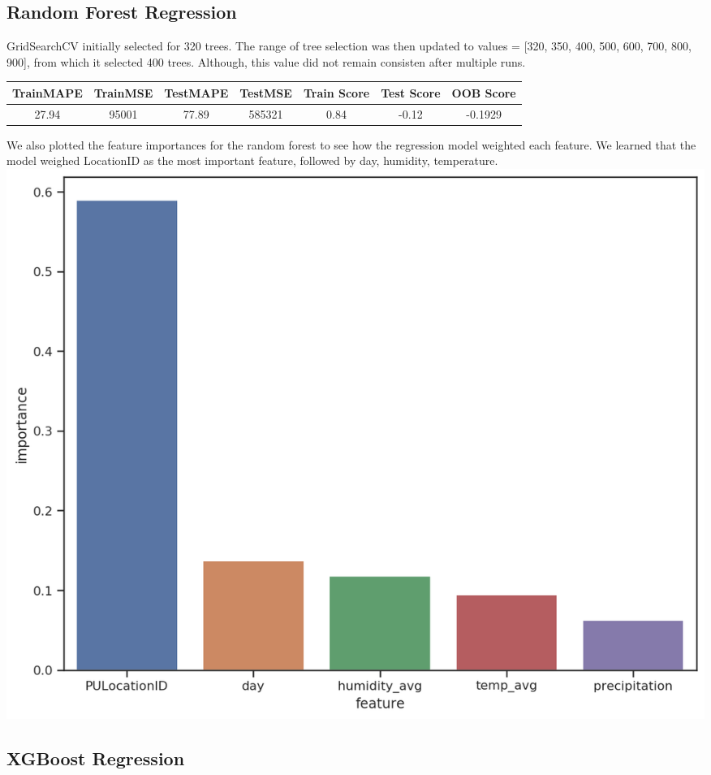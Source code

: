 \documentclass[journal, 12pt]{IEEEtran}
\begin{document}
\subsection{Random Forest Regression} 

\noindent GridSearchCV initially selected for 320 trees. The range of tree selection was then updated to   values = [320, 350, 400, 500, 600, 700, 800, 900], from which it selected 400 trees. Although, this value did not remain consisten after multiple runs.\\

\begingroup
    \medskip
    \centering
    \def\arraystretch{1.5}
        \begin{tabular}{ccccccc}
            \toprule
            TrainMAPE & TrainMSE & TestMAPE & TestMSE & Train Score & Test Score & OOB Score\\
            \midrule
            27.94 & 95001 & 77.89 & 585321 & 0.84 & -0.12 & -0.1929\\
            \bottomrule
        \end{tabular}
    \label{table:}
    \medskip
\endgroup

\noindent We also plotted the feature importances for the random forest to see how the regression model weighted each feature. We learned that the model weighed LocationID as the most important feature, followed by day, humidity, temperature.\\

\begingroup
    \centering
    \includegraphics[width=0.5\columnwidth]{report/images/feature_importance_rf.png}
    \label{fig:train_test_df}
    \medskip
\endgroup

\subsection{XGBoost Regression}
\end{document}
